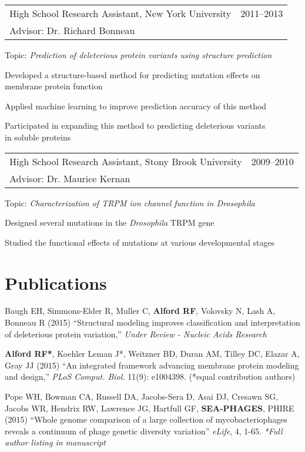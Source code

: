 \documentclass[12pt]{article}
\makeatletter
\newcommand{\allcapsspacing}[1]{{\addfontfeature{LetterSpace=7.5}#1}}
\newcommand{\researchitem}[4]{
\noindent
\begin{tabular*}{\textwidth}{@{\extracolsep{\fill}}lr}
		#1 & #2 \\
		#3 & \\
\end{tabular*}\newline#4\vspace{0.25\baselineskip}\par}
\makeatother
\begin{document}
\researchitem{High School Research Assistant, New York University}{2011--2013}{Advisor: Dr. Richard Bonneau}{Topic: \textit{Prediction of deleterious protein variants using structure prediction}}
\begin{compactitem}
\item Developed a structure-based method for predicting mutation effects on \\ membrane protein function
\item Applied machine learning to improve prediction accuracy of this method
\item Participated in expanding this method to predicting deleterious variants \\ in soluble proteins \\
\end{compactitem}

\researchitem{High School Research Assistant, Stony Brook University}{2009--2010}{Advisor: Dr. Maurice Kernan}{Topic: \textit{Characterization of TRPM ion channel function in Drosophila}}
\begin{compactitem}
\item Designed several mutations in the \textit{Drosophila} TRPM gene 
\item Studied the functional effects of mutations at various developmental stages \\
\end{compactitem}

\section*{\allcapsspacing{Publications}}

\begin{etaremune}
\item Baugh EH, Simmons-Elder R, Muller C, \textbf{Alford RF}, Volovsky N, Lash A, Bonneau R (2015) ``Structural modeling improves classification and interpretation of deleterious protein variation,'' \textit{Under Review - Nucleic Acids Research}

\item \textbf{Alford RF*}, Koehler Leman J*, Weitzner BD, Duran AM, Tilley DC, Elazar A, Gray JJ (2015) ``An integrated framework advancing membrane protein modeling and design,'' \textit{PLoS Comput. Biol.} 11(9): e1004398. (*equal contribution authors)

\item Pope WH, Bowman CA, Russell DA, Jacobs-Sera D, Asai DJ, Cresawn SG, Jacobs WR, Hendrix RW, Lawrence JG, Hartfull GF, \textbf{SEA-PHAGES}, PHIRE (2015) ``Whole genome comparison of a large collection of mycobacteriophages reveals a continuum of phage genetic diversity variation'' \textit{eLife}, 4, 1-65. \textit{*Full author listing in manuscript}
\end{etaremune}
\end{document}
